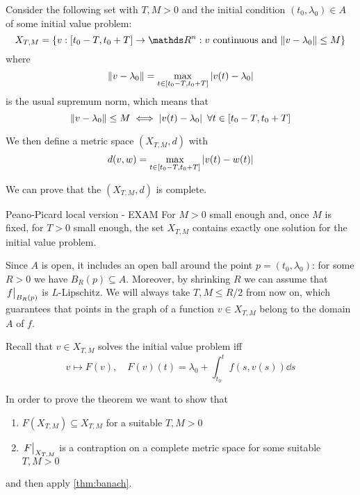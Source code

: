 \documentclass[12pt]{extarticle}
\numberwithin{equation}{section}
\begin{document}
Consider the following set with $T, M > 0$
and the initial condition $(t_0, \lambda_0) \in A$ of some initial value problem:
\begin{equation}
    X_{T, M} = \{ v: [t_0 - T, t_0 + T] \to \R^n : v \text{ continuous and } \norm{v-\lambda_0} \leq M \}
\end{equation}
where
\begin{equation}
    \norm{v-\lambda_0} = \max_{t \in [t_0 - T, t_0 + T]} \abs{v(t) - \lambda_0}
\end{equation}
is the usual supremum norm, which means that
\begin{equation}
    \norm{v - \lambda_0} \leq M \iff \abs{v(t) - \lambda_0} \enspace \forall t \in [t_0 - T, t_0 + T]
\end{equation}

We then define a metric space $(X_{T, M}, d)$ with
\begin{equation}
    d(v, w) = \max_{t \in [t_0 - T, t_0 + T]} \abs{v(t) - w(t)}
\end{equation}

We can prove that the $(X_{T,M}, d)$ is complete.

\begin{theorem}{Peano-Picard local version - EXAM}{}
    For $M > 0$ small enough and, once $M$ is fixed, for $T>0$ small enough, the set $X_{T, M}$ contains exactly one solution
    for the initial value problem.
\end{theorem}

Since $A$ is open, it includes an open ball around the point $p = (t_0, \lambda_0)$:
for some $R > 0$ we have $B_R(p) \subseteq A$.
Moreover, by shrinking $R$ we can assume that $\eval{f}_{B_R(p)}$ is $L$-Lipschitz.
We will always take $T, M \leq R/2$ from now on, which guarantees that points in the graph of a function $v \in X_{T, M}$ belong to the domain $A$ of $f$.

Recall that $v \in X_{T, M}$ solves the initial value problem iff
\begin{equation}
    v \mapsto F(v), \quad F(v)(t) = \lambda_0 + \int^t_{t_0} f(s, v(s)) \dd s
\end{equation}

In order to prove the theorem we want to show that
\begin{enumerate}
    \item $F(X_{T, M}) \subseteq X_{T, M}$ for a suitable $T, M >0$
    \item $\eval{F}_{X_{T, M}}$ is a contraption on a complete metric space for some suitable $T, M > 0$
\end{enumerate}
and then apply \cref{thm:banach}.
\end{document}
